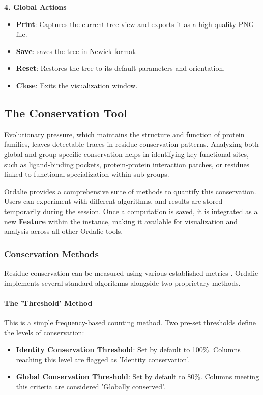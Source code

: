 \documentclass[a4paper]{article}
\begin{document}
\noindent\textbf{4. Global Actions}
\begin{itemize}
    \item \textbf{Print}: Captures the current tree view and exports it as a high-quality PNG file.
    \item \textbf{Save}: saves the tree in Newick format.
    \item \textbf{Reset}: Restores the tree to its default parameters and orientation.
    \item \textbf{Close}: Exits the visualization window.
\end{itemize}


\subsection{The Conservation Tool}
\label{tool-conservation}

Evolutionary pressure, which maintains the structure and function of protein families, leaves detectable traces in residue conservation patterns. Analyzing both global and group-specific conservation helps in identifying key functional sites, such as ligand-binding pockets, protein-protein interaction patches, or residues linked to functional specialization within sub-groups.

Ordalie provides a comprehensive suite of methods to quantify this conservation. Users can experiment with different algorithms, and results are stored temporarily during the session. Once a computation is saved, it is integrated as a new \textbf{Feature} within the instance, making it available for visualization and analysis across all other Ordalie tools.

\subsubsection{Conservation Methods}
Residue conservation can be measured using various established metrics \cite{valdar, johansson}. Ordalie implements several standard algorithms alongside two proprietary methods.

\paragraph{The 'Threshold' Method}
This is a simple frequency-based counting method. Two pre-set thresholds define the levels of conservation:
\begin{itemize}
    \item \textbf{Identity Conservation Threshold}: Set by default to 100\%. Columns reaching this level are flagged as 'Identity conservation'.
    \item \textbf{Global Conservation Threshold}: Set by default to 80\%. Columns meeting this criteria are considered 'Globally conserved'.
\end{itemize}
\end{document}
